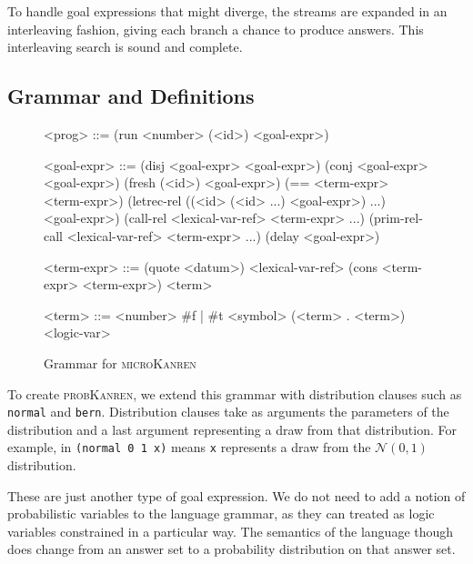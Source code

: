 \documentclass[
]{ceurart}
\begin{document}
To handle goal expressions that might diverge, the streams are
expanded in an interleaving\cite{kiselyov2005backtracking} fashion,
giving each branch a chance to produce answers. This interleaving search
is sound and complete\cite{rozplokhas2019certified}.

\subsection{Grammar and Definitions}

\begin{figure}
  \centering
  \begin{grammar}
<prog> ::= (run <number> (<id>) <goal-expr>)

<goal-expr> ::= (disj <goal-expr> <goal-expr>) \alt
	        (conj <goal-expr> <goal-expr>) \alt
                (fresh (<id>) <goal-expr>) \alt
		(== <term-expr> <term-expr>) \alt
		(letrec-rel ((<id> (<id> ...) <goal-expr>) ...) \\
		\hspace{\grammarindent} <goal-expr>) \alt
		(call-rel <lexical-var-ref> <term-expr> ...) \alt
		(prim-rel-call <lexical-var-ref> <term-expr> ...) \alt
		(delay <goal-expr>)

<term-expr> ::= (quote <datum>) \alt
                <lexical-var-ref> \alt
                (cons <term-expr> <term-expr>) \alt
                <term>

<term> ::= <number> \alt
           \#f | \#t \alt
	   <symbol> \alt
	   (<term> . <term>) \alt
	   <logic-var>

  \end{grammar}
  \caption{Grammar for \textsc{microKanren}}
  \label{fig:grammar}
\end{figure}

To create \textsc{probKanren}, we extend this grammar with distribution
clauses such as \texttt{normal} and \texttt{bern}. Distribution clauses
take as arguments the parameters of the distribution and a last argument
representing a draw from that distribution. For example, in \texttt{(normal 0 1 x)}
means \texttt{x} represents a draw from the $\mathcal{N}(0,1)$ distribution.

These are just another type of goal expression. We do not need to add
a notion of probabilistic variables to the language grammar, as they
can treated as logic variables constrained in a particular way. The
semantics of the language though does change from an answer set to a
probability distribution on that answer set.
\end{document}
